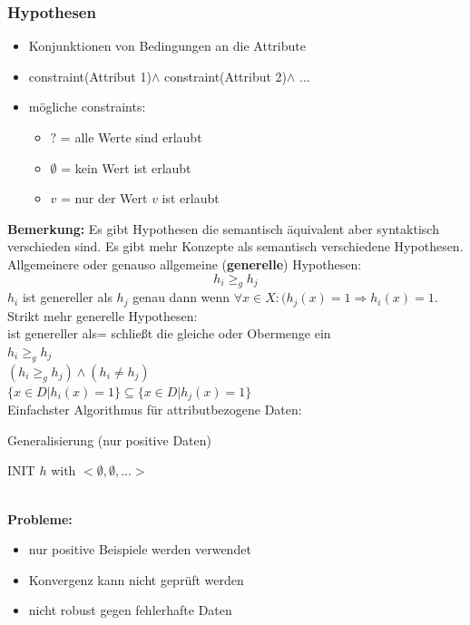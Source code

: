 	\subsubsection{Hypothesen}
	\begin{itemize}
		\item Konjunktionen von Bedingungen an die Attribute
		\item \dq constraint(Attribut 1)\dq $\land$ \dq constraint(Attribut 2)\dq $\land$ ...
		\item mögliche constraints:
		\begin{itemize}
			\item $?$ = alle Werte sind erlaubt
			\item $\emptyset$ = kein Wert ist erlaubt
			\item $v$ = nur der Wert $v$ ist erlaubt
		\end{itemize}
	\end{itemize}
	\textbf{Bemerkung:} Es gibt Hypothesen die semantisch äquivalent aber syntaktisch verschieden sind. Es gibt mehr Konzepte als semantisch verschiedene Hypothesen.\\[5pt]
	Allgemeinere oder genauso allgemeine (\textbf{generelle}) Hypothesen:
	\begin{equation*}
		h_i \ge_g h_j
	\end{equation*}
	$h_i$ ist genereller als $h_j$ genau dann wenn $\forall x \in X: (h_j(x)=1 \Rightarrow h_i(x)=1$.\\[5pt]
	Strikt mehr generelle Hypothesen:\\[5pt]
	\dq ist genereller als\dq = \dq schließt die gleiche oder Obermenge ein\dq\\ $h_i \ge_g h_j$\\ $(h_i \ge_g h_j) \land (h_i \ne h_j)$\\ $\{x \in D \vert h_i(x) = 1\} \subseteq \{x\in D\vert h_j(x)=1\}$\\[5pt]
	Einfachster Algorithmus für attributbezogene Daten:	
	\begin{algorithm}
		\caption{Generalisierung (nur positive Daten)}\label{euclid}
		\begin{algorithmic}[1]
			\State INIT $h$ with $<\emptyset, \emptyset, ...>$ 
			 
					 
					\Else
						 
					\EndIf
				\EndFor
			\EndFor
		\end{algorithmic}
	\end{algorithm}\\
	\textbf{Probleme:}
	\begin{itemize}
		\item nur positive Beispiele werden verwendet
		\item Konvergenz kann nicht geprüft werden
		\item nicht robust gegen fehlerhafte Daten
	\end{itemize}
